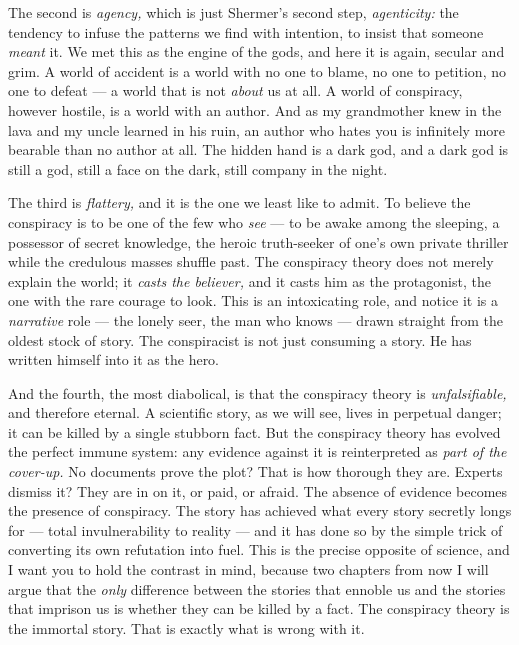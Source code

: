 The second is \emph{agency,} which is just Shermer's second step, \emph{agenticity:} the tendency to infuse the patterns we find with intention, to insist that someone \emph{meant} it. We met this as the engine of the gods, and here it is again, secular and grim. A world of accident is a world with no one to blame, no one to petition, no one to defeat — a world that is not \emph{about} us at all. A world of conspiracy, however hostile, is a world with an author. And as my grandmother knew in the lava and my uncle learned in his ruin, an author who hates you is infinitely more bearable than no author at all. The hidden hand is a dark god, and a dark god is still a god, still a face on the dark, still company in the night.

The third is \emph{flattery,} and it is the one we least like to admit. To believe the conspiracy is to be one of the few who \emph{see} — to be awake among the sleeping, a possessor of secret knowledge, the heroic truth-seeker of one's own private thriller while the credulous masses shuffle past. The conspiracy theory does not merely explain the world; it \emph{casts the believer,} and it casts him as the protagonist, the one with the rare courage to look. This is an intoxicating role, and notice it is a \emph{narrative} role — the lonely seer, the man who knows — drawn straight from the oldest stock of story. The conspiracist is not just consuming a story. He has written himself into it as the hero.

And the fourth, the most diabolical, is that the conspiracy theory is \emph{unfalsifiable,} and therefore eternal. A scientific story, as we will see, lives in perpetual danger; it can be killed by a single stubborn fact. But the conspiracy theory has evolved the perfect immune system: any evidence against it is reinterpreted as \emph{part of the cover-up.} No documents prove the plot? That is how thorough they are. Experts dismiss it? They are in on it, or paid, or afraid. The absence of evidence becomes the presence of conspiracy. The story has achieved what every story secretly longs for — total invulnerability to reality — and it has done so by the simple trick of converting its own refutation into fuel. This is the precise opposite of science, and I want you to hold the contrast in mind, because two chapters from now I will argue that the \emph{only} difference between the stories that ennoble us and the stories that imprison us is whether they can be killed by a fact. The conspiracy theory is the immortal story. That is exactly what is wrong with it.

